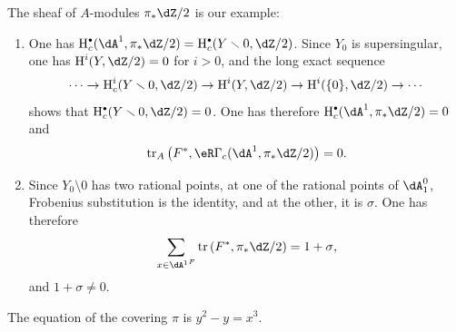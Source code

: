 The sheaf of $A$-modules $\pi_*\dZ/2$ is our example:
\begin{enumerate}[\indent a)]
  \item One has
    $\h_c^\bullet(\dA^1,\pi_*\dZ/2) = \h_c^\bullet(Y\setminus 0,\dZ/2)$.
    Since $Y_0$ is supersingular, one has $\h^i(Y,\dZ/2)=0$ for $i>0$, and
    the long exact sequence
    \[
      \cdots \to \h_c^i(Y\setminus 0,\dZ/2) \to \h^i(Y,\dZ/2) \to \h^i(\{0\},\dZ/2) \to \cdots
    \]
    shows that $\h_c^\bullet(Y\setminus 0,\dZ/2)=0$. One has therefore
    $\h_c^\bullet(\dA^1,\pi_*\dZ/2)=0$ and
    \[
      \tr_A\left(F^*,\eR\Gamma_c(\dA^1,\pi_*\dZ/2)\right) = 0 \text{.}
    \]
  \item Since $Y_0\setminus 0$ has two rational points, at one of the
    rational points of $\dA_1^0$, Frobenius substitution is the identity, and
    at the other, it is $\sigma$. One has therefore
    \[
      \sum_{x\in {\dA^1}^F} \tr\left(F^*,\pi_*\dZ/2\right) = 1+\sigma \text{,}
    \]
    and $1+\sigma\ne 0$.
\end{enumerate}

The equation of the covering $\pi$ is $y^2-y=x^3$.
